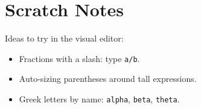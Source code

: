 
\section*{Scratch Notes}

Ideas to try in the visual editor:
\begin{itemize}
  \item Fractions with a slash: type \texttt{a/b}.
  \item Auto-sizing parentheses around tall expressions.
  \item Greek letters by name: \texttt{alpha}, \texttt{beta}, \texttt{theta}.
\end{itemize}
